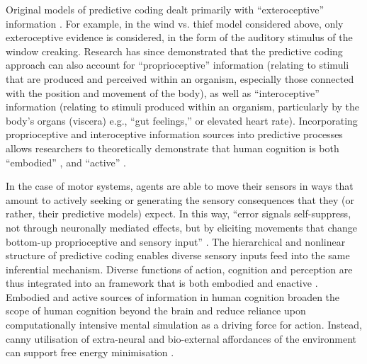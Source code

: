 \begin{CJK}{UTF8}{gbsn}
Original models of predictive coding dealt primarily with ``exteroceptive'' information \citep[relating to stimuli that are external to an organism, i.e. visual, auditory, haptic perception][]{Rao1999,Friston2010}.  For example, in the wind vs. thief model considered above, only exteroceptive evidence is considered, in the form of the auditory stimulus of the window creaking.  Research has since demonstrated that the predictive coding approach can also account for ``proprioceptive'' information (relating to stimuli that are produced and perceived within an organism, especially those connected with the position and movement of the body), as well as ``interoceptive'' information (relating to stimuli produced within an organism, particularly by the body's organs (viscera) e.g., ``gut feelings,'' or elevated heart rate).  Incorporating proprioceptive and interoceptive information sources into predictive processes allows researchers to theoretically demonstrate that human cognition is both ``embodied'' \citep[inference is rooted in and contingent upon visceral, interoceptive information ][]{Pezzulo2014}, and ``active'' \citep[in the sense that humans can move throughout the environment to reduce the discrepancy between proprioceptive predictions and actual body states][]{Friston2010,Clark2015}.

In the case of motor systems, agents are able to move their sensors in ways that amount to actively seeking or generating the sensory consequences that they (or rather, their predictive models) expect.  In this way, ``error signals self-suppress, not through neuronally mediated effects, but by eliciting movements that change bottom-up proprioceptive and sensory input'' \citep[][1349]{Friston2003}.  The hierarchical and nonlinear structure of predictive coding enables diverse sensory inputs feed into the same inferential mechanism.  Diverse functions of action, cognition and perception are thus integrated into an framework that is both embodied and enactive \citep{Friston2015}.  Embodied and active sources of information in human cognition broaden the scope of human cognition beyond the brain and reduce reliance upon computationally intensive mental simulation as a driving force for action.  Instead, canny utilisation of extra-neural and bio-external affordances of the environment can support free energy minimisation \citep{Clark2015}.


\end{CJK}
